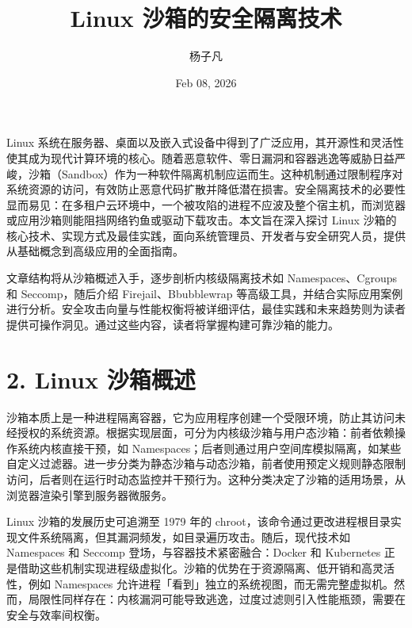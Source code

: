 \title{Linux 沙箱的安全隔离技术}
\author{杨子凡}
\date{Feb 08, 2026}
\maketitle
Linux 系统在服务器、桌面以及嵌入式设备中得到了广泛应用，其开源性和灵活性使其成为现代计算环境的核心。随着恶意软件、零日漏洞和容器逃逸等威胁日益严峻，沙箱（Sandbox）作为一种软件隔离机制应运而生。这种机制通过限制程序对系统资源的访问，有效防止恶意代码扩散并降低潜在损害。安全隔离技术的必要性显而易见：在多租户云环境中，一个被攻陷的进程不应波及整个宿主机，而浏览器或应用沙箱则能阻挡网络钓鱼或驱动下载攻击。本文旨在深入探讨 Linux 沙箱的核心技术、实现方式及最佳实践，面向系统管理员、开发者与安全研究人员，提供从基础概念到高级应用的全面指南。\par
文章结构将从沙箱概述入手，逐步剖析内核级隔离技术如 Namespaces、Cgroups 和 Seccomp，随后介绍 Firejail、Bbubblewrap 等高级工具，并结合实际应用案例进行分析。安全攻击向量与性能权衡将被详细评估，最佳实践和未来趋势则为读者提供可操作洞见。通过这些内容，读者将掌握构建可靠沙箱的能力。\par
\chapter{2. Linux 沙箱概述}
沙箱本质上是一种进程隔离容器，它为应用程序创建一个受限环境，防止其访问未经授权的系统资源。根据实现层面，可分为内核级沙箱与用户态沙箱：前者依赖操作系统内核直接干预，如 Namespaces；后者则通过用户空间库模拟隔离，如某些自定义过滤器。进一步分类为静态沙箱与动态沙箱，前者使用预定义规则静态限制访问，后者则在运行时动态监控并干预行为。这种分类决定了沙箱的适用场景，从浏览器渲染引擎到服务器微服务。\par
Linux 沙箱的发展历史可追溯至 1979 年的 chroot，该命令通过更改进程根目录实现文件系统隔离，但其漏洞频发，如目录遍历攻击。随后，现代技术如 Namespaces 和 Seccomp 登场，与容器技术紧密融合：Docker 和 Kubernetes 正是借助这些机制实现进程级虚拟化。沙箱的优势在于资源隔离、低开销和高灵活性，例如 Namespaces 允许进程「看到」独立的系统视图，而无需完整虚拟机。然而，局限性同样存在：内核漏洞可能导致逃逸，过度过滤则引入性能瓶颈，需要在安全与效率间权衡。\par
